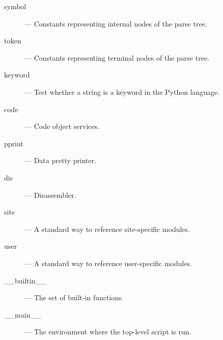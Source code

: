 \begin{description}
\item[symbol]
--- Constants representing internal nodes of the parse tree.

\item[token]
--- Constants representing terminal nodes of the parse tree.

\item[keyword]
--- Test whether a string is a keyword in the Python language.

\item[code]
--- Code object services.

\item[pprint]
--- Data pretty printer.

\item[dis]
--- Disassembler.

\item[site]
--- A standard way to reference site-specific modules.

\item[user]
--- A standard way to reference user-specific modules.

\item[__builtin__]
--- The set of built-in functions.

\item[__main__]
--- The environment where the top-level script is run.

\end{description}
